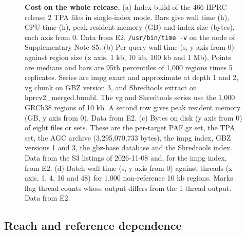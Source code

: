\begin{figure}[!tpb]
\centering
{}
\caption[Cost on the whole release]{\textbf{Cost on the whole release.}
(a) Index build of the 466 HPRC release 2 TPA files in single-index mode.
Bars give wall time (h), CPU time (h), peak resident memory (GB) and index size (bytes), each axis from 0.
Data from E2, \texttt{/usr/bin/time -v} on the node of Supplementary Note S5.
(b) Per-query wall time (s, y axis from 0) against region size (x axis, 1 kb, 10 kb, 100 kb and 1 Mb).
Points are medians and bars are 95th percentiles of 1,000 regions times 5 replicates.
Series are impg exact and approximate at depth 1 and 2, vg chunk on GBZ version 3, and Shredtools extract on hprcv2\_merged.bumbl.
The vg and Shredtools series use the 1,000 GRCh38 regions of 10 kb.
A second row gives peak resident memory (GB, y axis from 0).
Data from E2.
(c) Bytes on disk (y axis from 0) of eight files or sets.
These are the per-target PAF.gz set, the TPA set, the AGC archive (3,295,070,733 bytes), the impg index, GBZ versions 1 and 3, the gbz-base database and the Shredtools index.
Data from the S3 listings of 2026-11-08 and, for the impg index, from E2.
(d) Batch wall time (s, y axis from 0) against threads (x axis, 1, 4, 16 and 48) for 1,000 non-reference 10 kb regions.
Marks flag thread counts whose output differs from the 1-thread output.
Data from E2.}
\label{fig:cost}
\end{figure}

\subsection{Reach and reference dependence}
\label{sec:res-reach}

